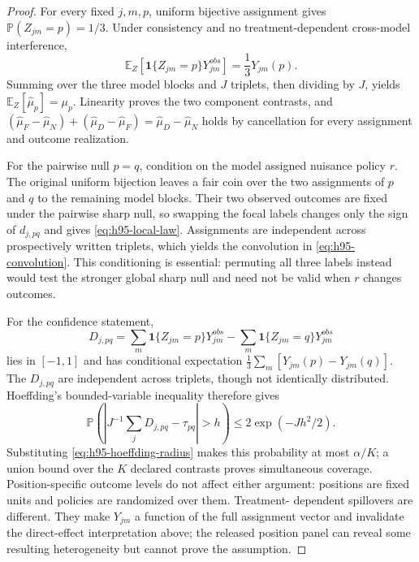\documentclass[11pt]{article}
\newcommand{\E}{\mathbb{E}}
\newcommand{\Prb}{\mathbb{P}}
\newcommand{\1}{\mathbf{1}}
\begin{document}
\begin{proof}
For every fixed $j,m,p$, uniform bijective assignment gives
$\Prb(Z_{jm}=p)=1/3$.  Under consistency and no treatment-dependent cross-model
interference,
\[
 \E_Z\!\left[\1\{Z_{jm}=p\}Y_{jm}^{obs}\right]
 =\frac{1}{3}Y_{jm}(p).
\]
Summing over the three model blocks and $J$ triplets, then dividing by $J$,
yields $\E_Z[\widehat\mu_p]=\mu_p$.  Linearity proves the two component
contrasts, and
$(\widehat\mu_F-\widehat\mu_N)+(\widehat\mu_D-\widehat\mu_F)
=\widehat\mu_D-\widehat\mu_N$ holds by cancellation for every assignment and
outcome realization.

For the pairwise null $p=q$, condition on the model assigned nuisance policy
$r$.  The original uniform bijection leaves a fair coin over the two assignments
of $p$ and $q$ to the remaining model blocks.  Their two observed outcomes are
fixed under the pairwise sharp null, so swapping the focal labels changes only
the sign of $d_{j,pq}$ and gives \cref{eq:h95-local-law}.  Assignments are
independent across prospectively written triplets, which yields the convolution
in \cref{eq:h95-convolution}.  This conditioning is essential: permuting all
three labels instead would test the stronger global sharp null and need not be
valid when $r$ changes outcomes.

For the confidence statement,
\[
 D_{j,pq}=\sum_m\1\{Z_{jm}=p\}Y_{jm}^{obs}
          -\sum_m\1\{Z_{jm}=q\}Y_{jm}^{obs}
\]
lies in $[-1,1]$ and has conditional expectation
$\frac13\sum_m[Y_{jm}(p)-Y_{jm}(q)]$.  The $D_{j,pq}$ are independent across
triplets, though not identically distributed.  Hoeffding's bounded-variable
inequality therefore gives
\[
 \Prb\!\left(\left|J^{-1}\sum_jD_{j,pq}-\tau_{pq}\right|>h\right)
 \leq 2\exp(-Jh^2/2).
\]
Substituting \cref{eq:h95-hoeffding-radius} makes this probability at most
$\alpha/K$; a union bound over the $K$ declared contrasts proves simultaneous
coverage.  Position-specific outcome levels do not affect either argument:
positions are fixed units and policies are randomized over them.  Treatment-
dependent spillovers are different.  They make $Y_{jm}$ a function of the full
assignment vector and invalidate the direct-effect interpretation above; the
released position panel can reveal some resulting heterogeneity but cannot
prove the assumption.
\end{proof}
\end{document}
